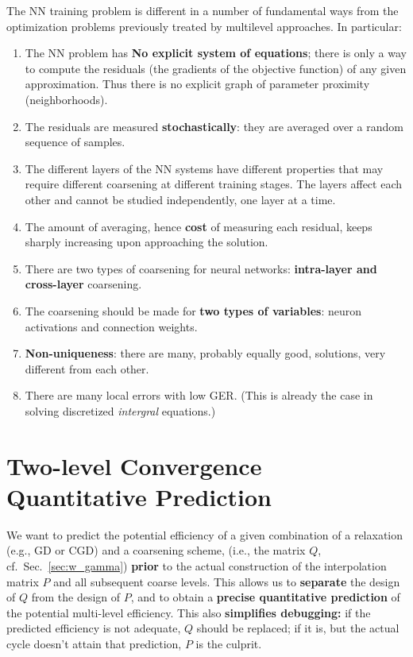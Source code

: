 \documentclass{article} %
\begin{document}
The NN training problem is different in a number of fundamental ways from the optimization problems previously treated by multilevel approaches. In particular:
\begin{enumerate}
	\item The NN problem has \textbf{No explicit system of equations}; there is only a way to compute the residuals (the gradients of the objective function) of any given approximation. Thus there is no explicit graph of parameter proximity (neighborhoods).
	\item The residuals are measured \textbf{stochastically}: they are averaged over a random sequence of samples.
        \item The different layers of the NN systems have different properties that may require different coarsening at different training stages. The layers affect each other and cannot be studied independently, one layer at a time.
	\item The amount of averaging, hence  \textbf{cost} of measuring each residual, keeps sharply increasing upon approaching the solution.
	\item There are two types of coarsening for neural networks: \textbf{intra-layer and cross-layer} coarsening.
	\item The coarsening should be made for \textbf{two types of variables}: neuron activations and connection weights.
	\item \textbf{Non-uniqueness}: there are many, probably equally good, solutions, very different from each other.
	\item There are many local errors with low GER. (This is already the case in solving discretized {\it intergral} equations.)
\end{enumerate}

\section{Two-level Convergence Quantitative Prediction}
\label{sec:mock_cycle}
We want to predict the potential efficiency of a given combination of a relaxation (e.g., GD or CGD) and a coarsening scheme, (i.e., the matrix $Q$, cf.~Sec.~\ref{sec:w_gamma}) \textbf{prior} to the actual construction of the interpolation matrix $P$ and all subsequent coarse levels. This allows us to \textbf{separate} the design of $Q$ from the design of $P$, and to obtain a \textbf{precise quantitative prediction} of the potential multi-level efficiency. This also \textbf{simplifies debugging:} if the predicted efficiency is not adequate, $Q$ should be replaced; if it is, but the actual cycle doesn't attain that prediction, $P$ is the culprit.
\end{document}
